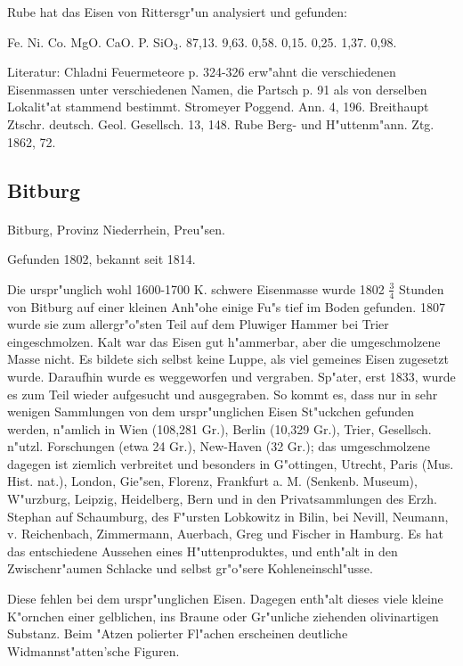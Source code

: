\documentclass[a4paper, 11pt, oneside]{article}
\begin{document}
Rube hat das Eisen von Rittersgr"un analysiert und gefunden:

Fe. Ni. Co. MgO. CaO. P. SiO$_{3}$.  
87,13. 9,63. 0,58. 0,15. 0,25. 1,37. 0,98.

Literatur: Chladni Feuermeteore p. 324-326 erw"ahnt die verschiedenen Eisenmassen unter verschiedenen Namen, die Partsch p. 91 als von derselben Lokalit"at stammend bestimmt. Stromeyer Poggend. Ann. 4, 196. Breithaupt Ztschr. deutsch. Geol. Gesellsch. 13, 148. Rube Berg- und H"uttenm"ann. Ztg. 1862, 72.

\subsection{Bitburg}
\normalsize
\paragraph{}
Bitburg, Provinz Niederrhein, Preu"sen.

Gefunden 1802, bekannt seit 1814.

Die urspr"unglich wohl 1600-1700 K. schwere Eisenmasse wurde 1802 $\frac{3}{4}$ Stunden von Bitburg auf einer kleinen Anh"ohe einige Fu"s tief im Boden gefunden. 1807 wurde sie zum allergr"o"sten Teil auf dem Pluwiger Hammer bei Trier eingeschmolzen. Kalt war das Eisen gut h"ammerbar, aber die umgeschmolzene Masse nicht. Es bildete sich selbst keine Luppe, als viel gemeines Eisen zugesetzt wurde. Daraufhin wurde es weggeworfen und vergraben. Sp"ater, erst 1833, wurde es zum Teil wieder aufgesucht und ausgegraben. So kommt es, dass nur in sehr wenigen Sammlungen von dem urspr"unglichen Eisen St"uckchen gefunden werden, n"amlich in Wien (108,281 Gr.), Berlin (10,329 Gr.), Trier, Gesellsch. n"utzl. Forschungen (etwa 24 Gr.), New-Haven (32 Gr.); das umgeschmolzene dagegen ist ziemlich verbreitet und besonders in G"ottingen, Utrecht, Paris (Mus. Hist. nat.), London, Gie"sen, Florenz, Frankfurt a. M. (Senkenb. Museum), W"urzburg, Leipzig, Heidelberg, Bern und in den Privatsammlungen des Erzh. Stephan auf Schaumburg, des F"ursten Lobkowitz in Bilin, bei Nevill, Neumann, v. Reichenbach, Zimmermann, Auerbach, Greg und Fischer in Hamburg. Es hat das entschiedene Aussehen eines H"uttenproduktes, und enth"alt in den Zwischenr"aumen Schlacke und selbst gr"o"sere Kohleneinschl"usse.

Diese fehlen bei dem urspr"unglichen Eisen. Dagegen enth"alt dieses viele kleine K"ornchen einer gelblichen, ins Braune oder Gr"unliche ziehenden olivinartigen Substanz. Beim "Atzen polierter Fl"achen erscheinen deutliche Widmannst"atten'sche Figuren.
\end{document}
